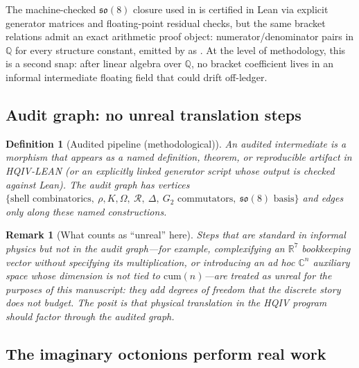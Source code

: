 \documentclass[11pt]{amsart}
\newtheorem{definition}[theorem]{Definition}
\newtheorem{remark}[theorem]{Remark}
\begin{document}
The machine-checked \(\mathfrak{so}(8)\) closure used in \cite{hqiv-so8-paper} is certified in Lean via explicit generator matrices and floating-point residual checks, but the same bracket relations admit an exact arithmetic proof object: numerator/denominator pairs in \(\mathbb{Q}\) for every structure constant, emitted by  as . At the level of methodology, this is a second snap: after linear algebra over \(\mathbb{Q}\), no bracket coefficient lives in an informal intermediate floating field that could drift off-ledger.

\subsection{Audit graph: no unreal translation steps}

\begin{definition}[Audited pipeline (methodological)]
An \emph{audited intermediate} is a morphism that appears as a named definition, theorem, or reproducible artifact in HQIV-LEAN (or an explicitly linked generator script whose output is checked against Lean). The \emph{audit graph} has vertices \(\{\text{shell combinatorics},\ \rho,K,\Omega,\ \mathcal{R},\ \Delta,\ G_2\text{ commutators},\ \mathfrak{so}(8)\text{ basis}\}\) and edges only along these named constructions.
\end{definition}

\begin{remark}[What counts as ``unreal'' here]
Steps that are standard in informal physics but \emph{not} in the audit graph---for example, complexifying an \(\mathbb{R}^7\) bookkeeping vector without specifying its multiplication, or introducing an ad hoc \(\mathbb{C}^n\) auxiliary space whose dimension is not tied to \(\mathrm{cum}(n)\)---are treated as \emph{unreal} for the purposes of this manuscript: they add degrees of freedom that the discrete story does not budget. The posit is that physical translation in the HQIV program should factor through the audited graph.
\end{remark}

\subsection[Imaginary octonions perform real work]{The imaginary octonions perform real work}
\end{document}
